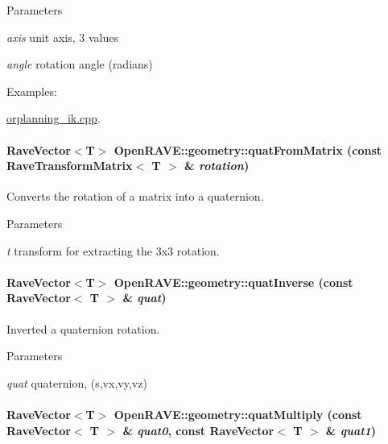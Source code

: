 \begin{DoxyParams}{Parameters}
\item[{\em axis}]unit axis, 3 values \item[{\em angle}]rotation angle (radians) \end{DoxyParams}
\begin{Desc}
\item[Examples: ]\par
\hyperlink{orplanning__ik_8cpp-example}{orplanning\_\-ik.cpp}.\end{Desc}
\hypertarget{group__affine__math_gad512ee3ebabb8c45bea16c84ca9ea9d4}{
\paragraph[{quatFromMatrix}]{\setlength{\rightskip}{0pt plus 5cm}RaveVector$<$T$>$ OpenRAVE::geometry::quatFromMatrix (const RaveTransformMatrix$<$ T $>$ \& {\em rotation})}\hfill}
\label{group__affine__math_gad512ee3ebabb8c45bea16c84ca9ea9d4}


Converts the rotation of a matrix into a quaternion. 


\begin{DoxyParams}{Parameters}
\item[{\em t}]transform for extracting the 3x3 rotation. \end{DoxyParams}
\hypertarget{group__affine__math_ga7aa03948b7cc76653b754376dcd55bae}{
\paragraph[{quatInverse}]{\setlength{\rightskip}{0pt plus 5cm}RaveVector$<$T$>$ OpenRAVE::geometry::quatInverse (const RaveVector$<$ T $>$ \& {\em quat})}\hfill}
\label{group__affine__math_ga7aa03948b7cc76653b754376dcd55bae}


Inverted a quaternion rotation. 


\begin{DoxyParams}{Parameters}
\item[{\em quat}]quaternion, (s,vx,vy,vz) \end{DoxyParams}
\hypertarget{group__affine__math_gac36d0b93e56274bdfb6e1e648b829536}{
\paragraph[{quatMultiply}]{\setlength{\rightskip}{0pt plus 5cm}RaveVector$<$T$>$ OpenRAVE::geometry::quatMultiply (const RaveVector$<$ T $>$ \& {\em quat0}, \/  const RaveVector$<$ T $>$ \& {\em quat1})}\hfill}
\label{group__affine__math_gac36d0b93e56274bdfb6e1e648b829536}


